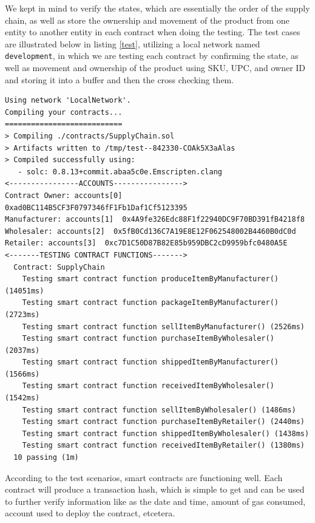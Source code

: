 We kept in mind to verify the states, which are essentially the order of the supply chain, as well as store the ownership and movement of the product from one entity to another entity in each contract when doing the testing. The test cases are illustrated below in listing \ref{test}, utilizing a local network named \texttt{development}, in which we are testing each contract by confirming the state, as well as movement and ownership of the product using \ac{SKU}, \ac{UPC}, and owner ID and storing it into a buffer and then the cross checking them.

\vspace{.5cm}

\begin{lstlisting}[caption={Smart Contracts Testing},label={test},numbers=none, basicstyle=\ttfamily\tiny]
Using network 'LocalNetwork'.
Compiling your contracts...
===========================
> Compiling ./contracts/SupplyChain.sol
> Artifacts written to /tmp/test--842330-COAk5X3aAlas
> Compiled successfully using:
   - solc: 0.8.13+commit.abaa5c0e.Emscripten.clang
<----------------ACCOUNTS---------------->
Contract Owner: accounts[0]  0xad0BC114B5CF3F0797346fF1Fb1Daf1Cf5123395
Manufacturer: accounts[1]  0x4A9fe326Edc88F1f22940DC9F70BD391fB4218f8
Wholesaler: accounts[2]  0x5fB0Cd136C7A19E8E12F062548002B4460B0dC0d
Retailer: accounts[3]  0xc7D1C50D87B82E85b959DBC2cD9959bfc0480A5E
<-------TESTING CONTRACT FUNCTIONS------->
  Contract: SupplyChain
    Testing smart contract function produceItemByManufacturer() (14051ms)
    Testing smart contract function packageItemByManufacturer() (2723ms)
    Testing smart contract function sellItemByManufacturer() (2526ms)
    Testing smart contract function purchaseItemByWholesaler() (2037ms)
    Testing smart contract function shippedItemByManufacturer() (1566ms)
    Testing smart contract function receivedItemByWholesaler() (1542ms)
    Testing smart contract function sellItemByWholesaler() (1486ms)
    Testing smart contract function purchaseItemByRetailer() (2440ms)
    Testing smart contract function shippedItemByWholesaler() (1438ms)
    Testing smart contract function receivedItemByRetailer() (1380ms)
  10 passing (1m)
\end{lstlisting}

\vspace{.5cm}

According to the test scenarios, smart contracts are functioning well. Each contract will produce a transaction hash, which is simple to get and can be used to further verify information like as the date and time, amount of gas consumed, account used to deploy the contract, etcetera.

